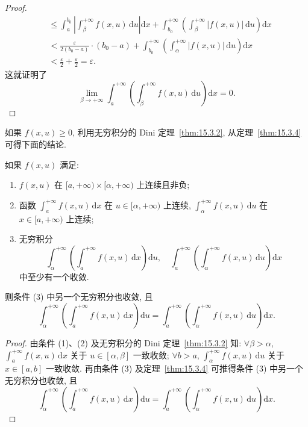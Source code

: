 \begin{proof}
\[\begin{aligned}
    &\leqslant\int_{a}^{b_{0}}\left|\int_{\beta}^{+\infty}f(x,u)\,\mathrm{d}u\right|\mathrm{d}x+\int_{b_{0}}^{+\infty}\left(\int_{\beta}^{+\infty}|f(x,u)|\,\mathrm{d}u\right)\mathrm{d}x\\
    &<\frac{\varepsilon}{2(b_{0}-a)}\cdot(b_{0}-a)+\int_{b_{0}}^{+\infty}\left(\int_{\alpha}^{+\infty}|f(x,u)|\,\mathrm{d}u\right)\mathrm{d}x\\
    &<\frac{\varepsilon}{2}+\frac{\varepsilon}{2}=\varepsilon.
  \end{aligned}
\]
这就证明了
\[
  \lim_{\beta\to+\infty}\int_{a}^{+\infty}\left(\int_{\beta}^{+\infty}f(x,u)\,\mathrm{d}u\right)\mathrm{d}x=0.
\]
\end{proof}

如果 $f(x,u)\geqslant0$, 利用无穷积分的 Dini 定理~\ref{thm:15.3.2}, 从定理~\ref{thm:15.3.4} 可得下面的结论.

\begin{theorem}[非负函数的无穷积分与无穷积分可交换]\label{thm:15.3.5}
如果 $f(x,u)$ 满足:
\begin{enumerate}
  \item $f(x,u)$ 在 $[a,+\infty)\times[\alpha,+\infty)$ 上连续且非负;
  \item 函数 $\displaystyle\int_{a}^{+\infty}f(x,u)\,\mathrm{d}x$ 在 $u\in[\alpha,+\infty)$ 上连续, $\displaystyle\int_{\alpha}^{+\infty}f(x,u)\,\mathrm{d}u$ 在 $x\in[a,+\infty)$ 上连续;
  \item 无穷积分
  \[
    \int_{\alpha}^{+\infty}\left(\int_{a}^{+\infty}f(x,u)\,\mathrm{d}x\right)\mathrm{d}u,\quad\int_{a}^{+\infty}\left(\int_{\alpha}^{+\infty}f(x,u)\,\mathrm{d}u\right)\mathrm{d}x
\]
  中至少有一个收敛.
\end{enumerate}
则条件 (3) 中另一个无穷积分也收敛, 且
\[
  \int_{\alpha}^{+\infty}\left(\int_{a}^{+\infty}f(x,u)\,\mathrm{d}x\right)\mathrm{d}u=\int_{a}^{+\infty}\left(\int_{\alpha}^{+\infty}f(x,u)\,\mathrm{d}u\right)\mathrm{d}x.
\]
\end{theorem}

\begin{proof}
由条件 (1)、(2) 及无穷积分的 Dini 定理~\ref{thm:15.3.2} 知:
$\forall\beta>\alpha$, $\displaystyle\int_{a}^{+\infty}f(x,u)\,\mathrm{d}x$ 关于 $u\in[\alpha,\beta]$ 一致收敛;
$\forall b>a$, $\displaystyle\int_{\alpha}^{+\infty}f(x,u)\,\mathrm{d}u$ 关于 $x\in[a,b]$ 一致收敛.
再由条件 (3) 及定理~\ref{thm:15.3.4} 可推得条件 (3) 中另一个无穷积分也收敛, 且
\[
  \int_{\alpha}^{+\infty}\left(\int_{a}^{+\infty}f(x,u)\,\mathrm{d}x\right)\mathrm{d}u=\int_{a}^{+\infty}\left(\int_{\alpha}^{+\infty}f(x,u)\,\mathrm{d}u\right)\mathrm{d}x.
\]
\end{proof}

